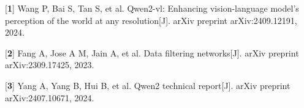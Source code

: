 \documentclass[zihao=false,fontset=windows]{ctexart}
\begin{document}
\par\vspace{0.95em}\par\vspace{0.28em}

[\textbf{1}]    Wang P, Bai S, Tan S, et al. Qwen2-vl: Enhancing vision-language model's perception of the world at any resolution[J]. arXiv preprint arXiv:2409.12191, 2024.\par

[\textbf{2}]    Fang A, Jose A M, Jain A, et al. Data filtering networks[J]. arXiv preprint arXiv:2309.17425, 2023.\par

[\textbf{3}]    Yang A, Yang B, Hui B, et al. Qwen2 technical report[J]. arXiv preprint arXiv:2407.10671, 2024.\par
\end{document}
